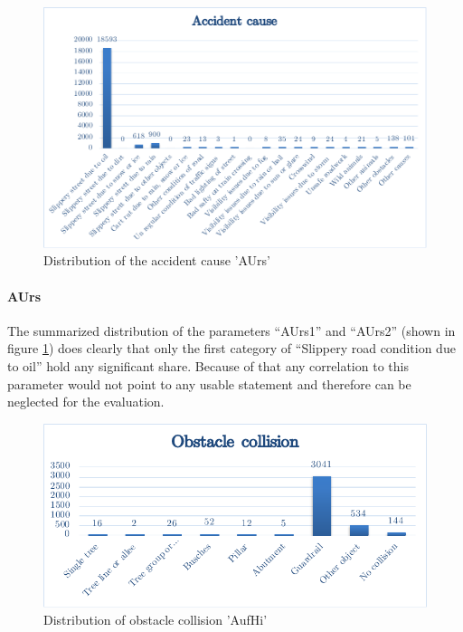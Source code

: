 \documentclass[a4paper,12pt]{report}
\begin{document}
\begin{figure}[h]
	\centering
	\includegraphics[scale=0.7]{./assets/baysis_dataset_AUrs.pdf}
	\caption{Distribution of the accident cause 'AUrs'}
	\label{img:baysis_dataset_AUrs}
\end{figure}

\paragraph{AUrs}
The summarized distribution of the parameters “AUrs1” and “AUrs2” (shown in figure \ref{img:baysis_dataset_AUrs}) does clearly that only the first category of “Slippery road condition due to oil” hold any significant share. Because of that any correlation to this parameter would not point to any usable statement and therefore can be neglected for the evaluation.

\begin{figure}[]
	\centering
	\includegraphics[scale=0.6]{./assets/baysis_dataset_Aufhi.pdf}
	\caption{Distribution of obstacle collision 'AufHi'}
	\label{img:baysis_dataset_Aufhi}
\end{figure}
\end{document}
